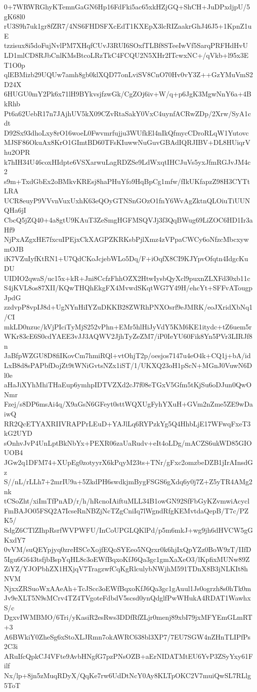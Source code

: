0+7WRWRGhyKTemnGaGN6Hp16FdFki5ac65xkHZjGQ+ShCH+JuDPxdjpU/5gK68l0
rU3S9h7uk1gr8fZR7/4NS6FHDSFXcEdT1KXEpX3lcRIZaakrGhJ46J5+1KpnZ1uE
tzzisux8i5doFujNvlPM7XHqfCUvJ3RUI6SOxfTLBf8STeeIwVf5SarqPRFHdHvU
LD1mlCD8RJbCnlKMsBtcoLRzTkC4FCQU2N5XHr2ITcwxNC+/qVkb+l95x3ET1O0p
qlEBMizb29UQUw7amh8gb0klXQD77onLviSV8CnO70Hv0vY3Z++GzYMuVmS2D24X
6HUGU0mY2Pk6x71lH9BYkvsjfzwGk/CgZOj6iv+W/q+p6JgK3MgwNnY6a+4BkRhb
Pt6a62UebR17n7JAjhUV5kX09CZvRtaSakY0VxC4uynfACRwZDp/2Xrw/SyA1cdt
D92Sx93dhoLxy8rO16woeL0Fwvmrfujju3WUfkEl4nIkQfmycCDroRLqW1Yutovc
MJSF86OkuAx8KrO1GImtBD60TFsKIuwwNuGuvGBAdIQRJIBV+DL8HUiqrVhu2OPR
k7hIH34U46coxHIdpte6VSXarwuLagRDZSe9LdWxqtIHCJuVs5yxJfmRGJvJM4c2
s9m+TxdGbEx2oBMkvKREsj8haPHuYfo9HqBpCg1mfw/fIkUKfapzZ98H3CYTtLRA
UCR8euyP9VVvnVuxUxhK63eQOyGTNSnGOzO1fnY6WvAgZktnQLOiuTiUUNQHa6jI
CbcQ5jZQ40+4a8gtU9KAuT3ZeSmgHGFMSQVJj3f3QqBWug69LiZOC6HD1Ir3aHf9
NjPxAZgxHE7fxcuIPEjxCkXAGPZKRKsbPjlXmz4zVPpaCWCy6oNfzcMbcxywmOJB
iK7VZuIyfKtRN1+U7QdCKoJcjebWLo5Dq/F+iOqfX8CI9KJYpvOfqtn4IdgcKuDU
UIDIO2qwaS/uc15x+kR+Jni8CcfzFhhOZX2HtwIysbQyXcl9puxnZLXFd30xb11c
S4jKVL8os87XII/KQwTHQhEkgFX4MvwdSKqtWG7Y49H/ehcYt+SFFvATougpJpdG
zzdvpP8vpIJ8d+UgNYnHiIYZuDKKB28ZWRhPNXOsrf9eJMRK/eoJXridXbNq1/CI
mkLD0nzuc/kVjPIciTyMjS252vPhn+EMr5hlHiJyVdY5KM6KE1itydc+tZ6uem5r
WKr83cE6S0cdYAEE3vJJ3AQWV2JjhTyZeZM7/iP0IeYU60Fik8Yn5PVr3LIRJf8n
JaBfpWZGU8D8fiIKovCm7hmiRQl+vtOhjT2p/oesjos7147u4eO4k+CQ1j+bA/id
LxB8d8sPAPbfDojZt9tWNiGvtsNZx1iST/1/UKXQ23oH1pScN+MGnJ0VuwN6Dl0e
aHaJiXYhMhiTHaEup6ymhpIDTVZXd2cJ7f08eTGxV5Gfm5tKjSu6oDJun0QwONmr
Fzej/s8DP6msAi4q/X9aGsN6GFeyt0sttWQXUgFyhYXuH+GVm2nZme5ZE9wDaiwQ
RR2QcETYAXRIIVRAPPrLEuD+YAJlLq6RYPzkYg5Q4HhbLjE17WFwqFxeT3kG2UYD
sOnhvJvP4UnLptBkNbYx+PEXR06zaUaRudv+eIt4oLDg/mACZS6ukWD85GIOUOB4
JGw2q1DFM74+XUpEg0zotyyrX6kPqyM23ts+TNr/gFxc2omzbeDZB1jIrAInsdGz
S//nL/rLLh7+2mrIU9a+5ZkdPH6swdkjmBygFSGS6gXdq6y0j7Z+Z5yTR4AMg2nk
tCSoZht/xiImTfPnAD/r/h/hRcnoIAiftuMLL34B1owGN92SfFbGyKZvmwiAcycl
FmBAJO05FSQ2A7IcseRnNBZjNcTZgCniIq7lWgndRfgKEMvtdaQepB/T7c/PZK5/
SdgZ6CTlZIhpRsrfWVPWFU/InCoUPGLQKlPd/p5m6mkJ+wg9jh6dHVCW5gGKxdY7
0vVM/suQEYpjyq0zreHSCeXojfEQoSYEeo5NQrxr0k6hjIxQpYZz0BoW9zT/IIfD
5Igu6G643tsfjbBspYqHL8c3oEWfBqxoKfJ6Qa3gc1gmXaXeO3/lKpfixMUNw89Z
ZiYZ/YJOPbhZX1HXjqV7TragzwfCqKgRlculybNWjhM591TDnX8B3jNLKIt8hNVM
NjxxZRSuoWxAAeAh+TcJScc3oEWfBqxoKfJ6Qa3gc1gAuul1Js0ogrzh8s0hTk0m
Jv9eXLT5N9sMCrv4TZ4TVgoteFdbdV5scsd0ynQdglfPwWHukA4RDAT1WawhxS/c
DgxvIWMBMO/6Tri/yKasiR2esRws3DDfRfZLjr0menj89xbI79jxMFYEmGLmRT+3
A6BWkiY0ZheSg6xStoXLJRmn7okAWRC638bl3XP7/7EU7SGW4nZHnTLIPfPs2C3i
ARuIfcQpkCJ4VFte9AvbHNgfG7pzPNsOZB+aErNIDATMtEU6YvP3ZSyYxy61Filf
Nx/lp+8jn5zMuqRDyX/QqKe7rw6UdDtNcY0Ay8KLTpOKC2V7muiQwSL7RLlg5ToT
